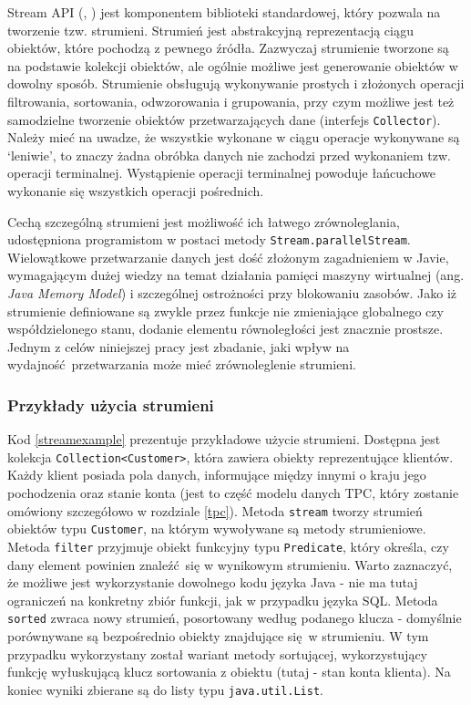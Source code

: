 \documentclass[12pt,twoside,openright]{extarticle}
\begin{document}
    Stream API (\cite{streamsdoc1}, \cite{streamsdoc2}) jest komponentem biblioteki standardowej, który pozwala na tworzenie tzw. strumieni. Strumień jest abstrakcyjną reprezentacją ciągu obiektów, które pochodzą z pewnego źródła. Zazwyczaj strumienie tworzone są na podstawie kolekcji obiektów, ale ogólnie możliwe jest generowanie obiektów w dowolny sposób. Strumienie obsługują wykonywanie prostych i złożonych operacji filtrowania, sortowania, odwzorowania i grupowania, przy czym możliwe jest też samodzielne tworzenie obiektów przetwarzających dane (interfejs \texttt{Collector}). Należy mieć na uwadze, że wszystkie wykonane w ciągu operacje wykonywane są `leniwie', to znaczy żadna obróbka danych nie zachodzi przed wykonaniem tzw. operacji terminalnej. Wystąpienie operacji terminalnej powoduje łańcuchowe wykonanie się wszystkich operacji pośrednich.

    Cechą szczególną strumieni jest możliwość ich łatwego zrównoleglania, udostępniona programistom w postaci metody \texttt{Stream.parallelStream}. Wielowątkowe przetwarzanie danych jest dość złożonym zagadnieniem w Javie, wymagającym dużej wiedzy na temat działania pamięci maszyny wirtualnej (ang. \textit{Java Memory Model}) i szczególnej ostrożności przy blokowaniu zasobów. Jako iż strumienie definiowane są zwykle przez funkcje nie zmieniające globalnego czy współdzielonego stanu, dodanie elementu równoległości jest znacznie prostsze. Jednym z celów niniejszej pracy jest zbadanie, jaki wpływ na wydajność przetwarzania może mieć zrównoleglenie strumieni.

\subsubsection{Przykłady użycia strumieni}

    Kod \ref{streamexample} prezentuje przykładowe użycie strumieni. Dostępna jest kolekcja \newline \texttt{Collection<Customer>}, która zawiera obiekty reprezentujące klientów. Każdy klient posiada pola danych, informujące między innymi o kraju jego pochodzenia oraz stanie konta (jest to część modelu danych TPC, który zostanie omówiony szczegółowo w rozdziale \ref{tpc}). Metoda \texttt{stream} tworzy strumień obiektów typu \texttt{Customer}, na którym wywoływane są metody strumieniowe. Metoda \texttt{filter} przyjmuje obiekt funkcyjny typu \texttt{Predicate}, który określa, czy dany element powinien znaleźć się w wynikowym strumieniu. Warto zaznaczyć, że możliwe jest wykorzystanie dowolnego kodu języka Java - nie ma tutaj ograniczeń na konkretny zbiór funkcji, jak w przypadku języka SQL. Metoda \texttt{sorted} zwraca nowy strumień, posortowany według podanego klucza - domyślnie porównywane są bezpośrednio obiekty znajdujące się w strumieniu. W tym przypadku wykorzystany został wariant metody sortującej, wykorzystujący funkcję wyłuskującą klucz sortowania z obiektu (tutaj - stan konta klienta). Na koniec wyniki zbierane są do listy typu \texttt{java.util.List}. 
\end{document}
